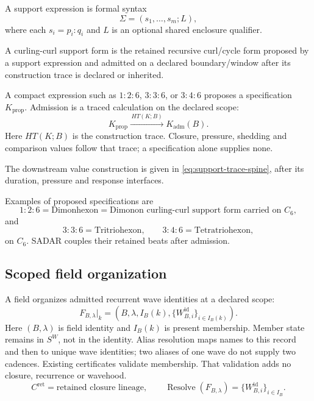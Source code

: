 \begin{definition}
A support expression is formal syntax
\begin{equation}
\Sigma=(s_1,\ldots,s_m;L),
\label{eq:support-expression}
\end{equation}
where each \(s_i=p_i{:}q_i\) and \(L\) is an optional shared enclosure qualifier.
\end{definition}

\begin{definition}
A curling-curl support form is the retained recursive curl/cycle form proposed by a support expression and admitted on a declared boundary/window after its construction trace is declared or inherited.
\end{definition}

A compact expression such as \(1{:}2{:}6\), \(3{:}3{:}6\), or \(3{:}4{:}6\) proposes a specification \(K_{\mathrm{prop}}\). Admission is a traced calculation on the declared scope:
\begin{equation}
K_{\mathrm{prop}}
\xrightarrow{\,HT(K;B)\,}
K_{\mathrm{adm}}(B).
\label{eq:key-proposed-admitted-trace}
\end{equation}
Here \(HT(K;B)\) is the construction trace. Closure, pressure, shedding and
comparison values follow that trace; a specification alone supplies none.

The downstream value construction is given in \eqref{eq:support-trace-spine}, after its duration, pressure and response interfaces.


Examples of proposed specifications are
\[
1{:}2{:}6=\text{Dimonhexon}
=\text{Dimonon curling-curl support form carried on }C_6,
\]
and
\[
3{:}3{:}6=\text{Tritriohexon},
\qquad
3{:}4{:}6=\text{Tetratriohexon},
\]
on \(C_6\). SADAR couples their retained beats after admission.


\subsection{Scoped field organization}
\label{sec:field}
\label{sec:field-disposition}
\label{subsec:declared-field-choice}
A field organizes admitted recurrent wave identities at a declared scope:
\begin{equation}
F_{B,\lambda}|_k=(B,\lambda,I_B(k),
\{W^{\mathrm{id}}_{B,i}\}_{i\in I_B(k)}).
\label{eq:field-organization}
\end{equation}
Here \((B,\lambda)\) is field identity and \(I_B(k)\) is present membership.
Member state remains in \(S^W\), not in the identity. Alias resolution maps
names to this record and then to unique wave identities; two aliases of one
wave do not supply two cadences. Existing certificates validate membership.
That validation adds no closure, recurrence or wavehood.
\begin{equation}
C^{\mathrm{ret}}=\text{retained closure lineage},\qquad
\operatorname{Resolve}(F_{B,\lambda})=\{W^{\mathrm{id}}_{B,i}\}_{i\in I_B}.
\label{eq:retained-lineage-field-separation}
\end{equation}
